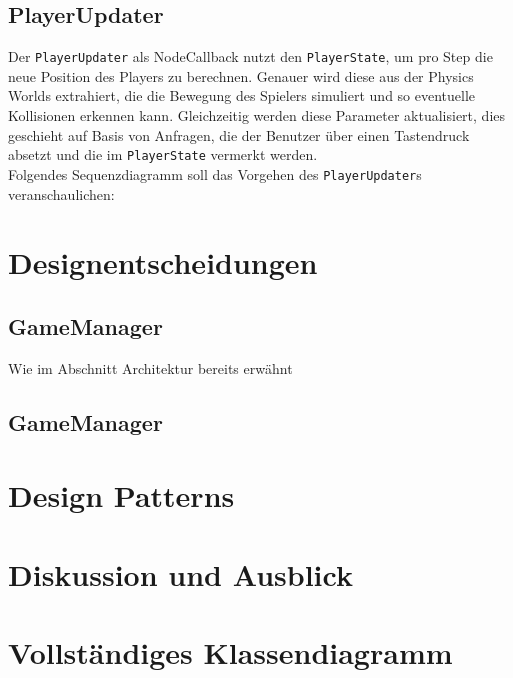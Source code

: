 \documentclass{llncs}
\begin{document}
\subsection{PlayerUpdater}
Der \texttt{PlayerUpdater} als NodeCallback nutzt den \texttt{PlayerState}, um pro Step die neue Position des Players
zu berechnen. Genauer wird diese aus der Physics Worlds extrahiert, die die Bewegung des Spielers simuliert und so
eventuelle Kollisionen erkennen kann. Gleichzeitig werden diese Parameter aktualisiert, dies geschieht auf Basis von
Anfragen, die der Benutzer \"uber einen Tastendruck absetzt und die im \texttt{PlayerState} vermerkt werden.\\
Folgendes Sequenzdiagramm soll das Vorgehen des \texttt{PlayerUpdater}s veranschaulichen:

\section{Designentscheidungen}

\subsection{GameManager}
Wie im Abschnitt Architektur bereits erw\"ahnt 


\subsection{GameManager}


\section{Design Patterns}



\section{Diskussion und Ausblick}



\newpage
\appendix

\section{Vollst\"andiges Klassendiagramm}
\end{document}

